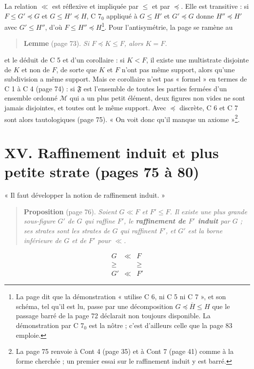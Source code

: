 \documentclass[11pt,a4paper]{article}
\begin{document}
La relation $\ll$ est réflexive et impliquée par $\leq$ et par $\preccurlyeq$.
Elle est transitive : si $F \leq G' \preccurlyeq G$ et $G \leq H'
\preccurlyeq H$, C 7$_{0}$ appliqué à $G \leq H'$ et $G' \preccurlyeq G$ donne
$H'' \preccurlyeq H'$ avec $G' \leq H''$, d'où $F \leq H'' \preccurlyeq
H$\footnote{La page dit que la démonstration « utilise C 6, ni C 5 ni C 7 », et
son schéma, tel qu'il est lu, passe par une décomposition $G \preccurlyeq
\overline{H} \leq H$ que le passage barré de la page 72 déclarait non
toujours disponible. La démonstration par C 7$_{0}$ est la nôtre ; c'est
d'ailleurs celle que la page 83 emploie.}. Pour l'antisymétrie, la page se
ramène au

\begin{quote}
\textbf{Lemme} (page 73). \emph{Si $F \preccurlyeq K \leq F$, alors $K = F$.}
\end{quote}

et le déduit de C 5 et d'un corollaire : si $K < F$, il existe une multistrate
disjointe de $K$ et non de $F$, de sorte que $K$ et $F$ n'ont pas même support,
alors qu'une subdivision a même support. Mais ce corollaire n'est pas
« formel » en termes de C 1 à C 4 (page 74) : si $\mathfrak{F}$ est l'ensemble
de toutes les parties fermées d'un ensemble ordonné $\mathcal{M}$ qui a un plus
petit élément, deux figures non vides ne sont jamais disjointes, et toutes ont
le même support. Avec $\preccurlyeq$ discrète, C 6 et C 7 sont alors
tautologiques (page 75). « On voit donc qu'il manque un axiome »\footnote{La page
75 renvoie à Cont 4 (page 35) et à Cont 7 (page 41) comme à la forme cherchée ;
un premier essai sur le raffinement induit y est barré.}.

\section*{XV. Raffinement induit et plus petite strate (pages 75 à 80)}

« Il faut développer la notion de raffinement induit. »

\begin{quote}
\textbf{Proposition} (page 76). \emph{Soient $G \ll F$ et $F' \leq F$. Il
existe une plus grande sous-figure $G'$ de $G$ qui raffine $F'$, le
\textbf{raffinement de $F'$ induit} par $G$ ; ses strates sont les strates de
$G$ qui raffinent $F'$, et $G'$ est la borne inférieure de $G$ et de $F'$ pour
$\ll$.}
\end{quote}
\[
\begin{array}{ccc}
G & \ll & F \\
\geq & & \geq \\
G' & \ll & F'
\end{array}
\]
\end{document}
